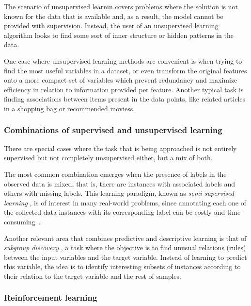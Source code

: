 The scenario of unsupervised learnin  covers problems where the solution is not known for the data that is available and, as a result, the model cannot be provided with supervision. Instead, the user of an unsupervised learning algorithm looks to find some sort of inner structure or hidden patterns in the data.

One case where unsupervised learning methods are convenient is when trying to find the most useful variables in a dataset, or even transform the original features onto a more compact set of variables which prevent redundancy and maximize efficiency in relation to information provided per feature. Another typical task is finding associations between items present in the data points, like related articles in a shopping bag or recommended moviess. 

\subsubsection{Combinations of supervised and unsupervised learning}

There are special cases where the task that is being approached is not entirely supervised but not completely unsupervised either, but a mix of both.

The most common combination emerges when the presence of labels in the observed data is mixed, that is, there are instances with associated labels and others with missing labels. This learning paradigm, known as \textit{semi-supervised learning} , is of interest in many real-world problems, since annotating each one of the collected data instances with its corresponding label can be costly and time-consuming~. 

Another relevant area that combines predictive and descriptive learning is that of \textit{subgroup discovery} , a task where the objective is to find unusual relations (rules) between the input variables and the target variable. Instead of learning to predict this variable, the idea is to identify interesting subsets of instances according to their relation to the target variable and the rest of samples.

\subsubsection{Reinforcement learning}

